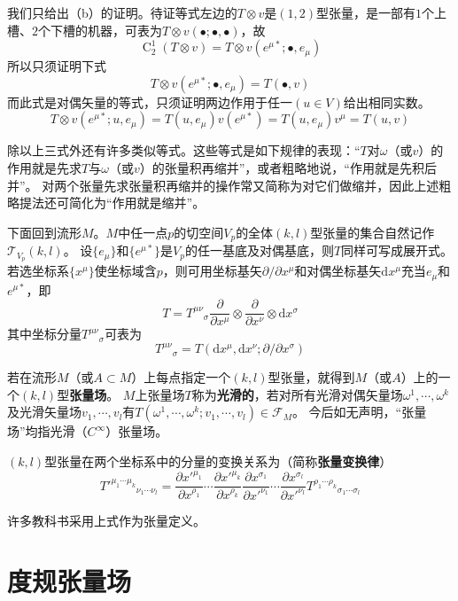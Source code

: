 我们只给出（b）的证明。待证等式左边的$T \otimes v$是$(1, 2)$型张量，是一部有$1$个上槽、$2$个下槽的机器，可表为$T \otimes v(\bullet; \bullet, \bullet)$，故
$$\operatorname{C}^1_2(T \otimes v) = T \otimes v(e^{\mu*}; \bullet, e_\mu)$$
所以只须证明下式
$$T \otimes v(e^{\mu*}; \bullet, e_\mu) = T(\bullet, v)$$
而此式是对偶矢量的等式，只须证明两边作用于任一$(u \in V)$给出相同实数。
$$T \otimes v(e^{\mu*}; u, e_\mu) = T(u, e_\mu)v(e^{\mu*}) = T(u, e_\mu)v^\mu = T(u, v)$$

除以上三式外还有许多类似等式。这些等式是如下规律的表现：``$T$对$\omega$（或$v$）的作用就是先求$T$与$\omega$（或$v$）的张量积再缩并''，或者粗略地说，``作用就是先积后并''。
对两个张量先求张量积再缩并的操作常又简称为对它们做缩并，因此上述粗略提法还可简化为``作用就是缩并''。

下面回到流形$M$。$M$中任一点$p$的切空间$V_p$的全体$(k, l)$型张量的集合自然记作$\mathscr{T}_{V_p}(k, l)$。
设$\{e_\mu\}$和$\{e^{\mu*}\}$是$V_p$的任一基底及对偶基底，则$T$同样可写成展开式。
若选坐标系$\{x^\mu\}$使坐标域含$p$，则可用坐标基矢$\partial / \partial x^\mu$和对偶坐标基矢$\mathrm{d}x^\mu$充当$e_\mu$和$e^{\mu*}$，即
$$T = T^{\mu\nu}{}_\sigma\frac{\partial}{\partial x^\mu}\otimes\frac{\partial}{\partial x^\nu}\otimes\mathrm{d}x^\sigma$$
其中坐标分量$T^{\mu\nu}{}_\sigma$可表为
$$T^{\mu\nu}{}_\sigma = T(\mathrm{d}x^\mu, \mathrm{d}x^\nu; \partial / \partial x^\sigma)$$

若在流形$M$（或$A \subset M$）上每点指定一个$(k, l)$型张量，就得到$M$（或$A$）上的一个$(k, l)$型\textbf{张量场}。
$M$上张量场$T$称为\textbf{光滑的}，若对所有光滑对偶矢量场$\omega^1, \cdots, \omega^k$及光滑矢量场$v_1, \cdots, v_l$有$T(\omega^1, \cdots, \omega^k; v_1, \cdots, v_l) \in \mathscr{F}_M$。
今后如无声明，``张量场''均指光滑（$C^\infty$）张量场。

\begin{theorem}
$(k, l)$型张量在两个坐标系中的分量的变换关系为（简称\textbf{张量变换律}）
$$T'^{\mu_1\cdots\mu_k}{}_{\nu_1\cdots\nu_l} = \frac{\partial x'^{\mu_1}}{\partial x^{\rho_1}}\cdots\frac{\partial x'^{\mu_k}}{\partial x^{\rho_k}}\frac{\partial x^{\sigma_1}}{\partial x'^{\nu_1}}\cdots\frac{\partial x^{\sigma_l}}{\partial x'^{\nu_l}}T^{\rho_1\cdots\rho_k}{}_{\sigma_1\cdots\sigma_l}$$
\end{theorem}

\begin{note}
许多教科书采用上式作为张量定义。
\end{note}

\section{度规张量场}

